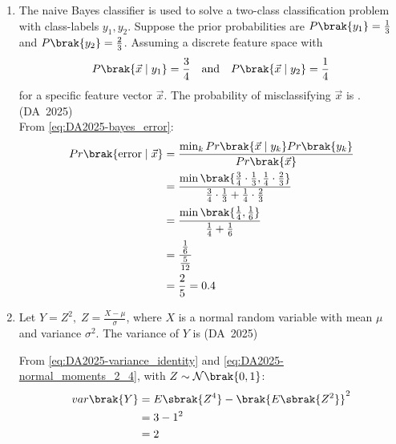 \begin{enumerate}[label=\thesubsection.\arabic*, ref=\thesubsection.\theenumi]
	\item 
	The naive Bayes classifier is used to solve a two-class classification problem with class-labels $y_1, y_2$. Suppose the prior probabilities are $P\brak{y_1} = \frac{1}{3}$ and $P\brak{y_2} = \frac{2}{3}$. Assuming a discrete feature space with
	\begin{align}
		P\brak{\vec{x} \mid y_1} = \frac{3}{4} \quad \text{and} \quad P\brak{\vec{x} \mid y_2} = \frac{1}{4}
	\end{align}
	for a specific feature vector $\vec{x}$. The probability of misclassifying $\vec{x}$ is \underline{\hspace{1.5cm}}.
	\hfill (DA~2025)
	\\
	\solution
	From \eqref{eq:DA2025-bayes_error}:
	\begin{align}
		Pr\brak{\text{error} \mid \vec{x}} &= \frac{\min_k Pr\brak{\vec{x} \mid y_k} Pr\brak{y_k}}{Pr\brak{\vec{x}}}
		\\
		&= \frac{\min\brak{\frac{3}{4} \cdot \frac{1}{3}, \frac{1}{4} \cdot \frac{2}{3}}}{\frac{3}{4} \cdot \frac{1}{3} + \frac{1}{4} \cdot \frac{2}{3}}
		\\
		&= \frac{\min\brak{\frac{1}{4}, \frac{1}{6}}}{\frac{1}{4} + \frac{1}{6}}
		\\
		&= \frac{\frac{1}{6}}{\frac{5}{12}}
		\\
		&= \frac{2}{5} = 0.4
	\end{align}
	
	\item 
	Let $Y = Z^2, \; Z = \frac{X - \mu}{\sigma}$, where $X$ is a normal random variable with mean $\mu$ and variance $\sigma^2$. The variance of $Y$ is
	\hfill (DA~2025)
	\begin{enumerate}
	\end{enumerate}
	\solution
	From \eqref{eq:DA2025-variance_identity} and \eqref{eq:DA2025-normal_moments_2_4}, with $Z \sim \mathcal{N}\brak{0, 1}$:
	\begin{align}
		var\brak{Y} &= E\sbrak{Z^4} - \brak{E\sbrak{Z^2}}^2
		\\
		&= 3 - 1^2
		\\
		&= 2
	\end{align}
	

\end{enumerate}
